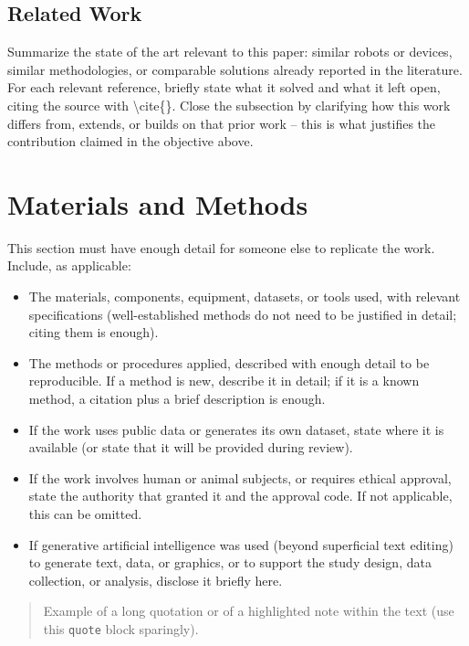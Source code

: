 \documentclass[lettersize,journal]{IEEEtran}
\begin{document}
\subsection{Related Work}

Summarize the state of the art relevant to this paper: similar
robots or devices, similar methodologies, or comparable solutions
already reported in the literature. For each relevant reference,
briefly state what it solved and what it left open, citing the source
with \textbackslash cite\{\}. Close the subsection by clarifying how
this work differs from, extends, or builds on that prior work -- this
is what justifies the contribution claimed in the objective above.

\section{Materials and Methods}
\label{sec:methods}

This section must have enough detail for someone else to replicate
the work. Include, as applicable:
\begin{itemize}
\item The materials, components, equipment, datasets, or tools used,
with relevant specifications (well-established methods do not need to
be justified in detail; citing them is enough).
\item The methods or procedures applied, described with enough detail
to be reproducible. If a method is new, describe it in detail; if it
is a known method, a citation plus a brief description is enough.
\item If the work uses public data or generates its own dataset,
state where it is available (or state that it will be provided during
review).
\item If the work involves human or animal subjects, or requires
ethical approval, state the authority that granted it and the
approval code. If not applicable, this can be omitted.
\item If generative artificial intelligence was used (beyond
superficial text editing) to generate text, data, or graphics, or to
support the study design, data collection, or analysis, disclose it
briefly here.
\end{itemize}

\begin{quote}
Example of a long quotation or of a highlighted note within the
text (use this \texttt{quote} block sparingly).
\end{quote}
\end{document}
